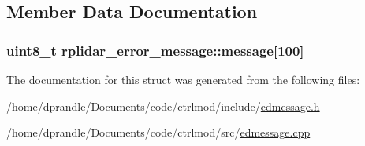 \subsection{Member Data Documentation}
\hypertarget{structrplidar__error__message_a788f75a0c9edbe2c0c154dbe3b48672f}{
\subsubsection[{message}]{\setlength{\rightskip}{0pt plus 5cm}uint8\-\_\-t rplidar\-\_\-error\-\_\-message\-::message\mbox{[}100\mbox{]}}}\label{structrplidar__error__message_a788f75a0c9edbe2c0c154dbe3b48672f}


The documentation for this struct was generated from the following files\-:\begin{DoxyCompactItemize}
\item 
/home/dprandle/\-Documents/code/ctrlmod/include/\hyperlink{edmessage_8h}{edmessage.\-h}\item 
/home/dprandle/\-Documents/code/ctrlmod/src/\hyperlink{edmessage_8cpp}{edmessage.\-cpp}\end{DoxyCompactItemize}
